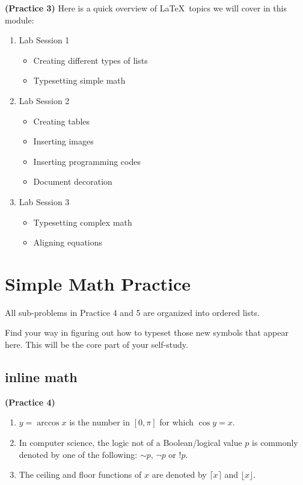 \documentclass[12pt]{article}
\begin{document}
\textbf{(Practice 3)} Here is a quick overview of \LaTeX\ topics we will cover in this module:

\begin{enumerate}
    \item Lab Session 1
    \begin{itemize}
        \item Creating different types of lists
        \item Typesetting simple math
    \end{itemize}

    \item Lab Session 2
    \begin{itemize}
        \item Creating tables
        \item Inserting images
        \item Inserting programming codes
        \item Document decoration
    \end{itemize}

    \item Lab Session 3
    \begin{itemize}
        \item Typesetting complex math
        \item Aligning equations
    \end{itemize}
\end{enumerate}

\newpage

\section{Simple Math Practice}

All sub-problems in Practice 4 and 5 are organized into ordered lists.

Find your way in figuring out how to typeset those new symbols that appear
here. This will be the core part of your self-study.

\subsection{inline math}

\textbf{(Practice 4)}

\begin{enumerate}
    \item $y = \arccos x$ is the number in $[0, \pi]$ for which $\cos y = x$.

    \item In computer science, the logic not of a Boolean/logical value $p$ is commonly
    denoted by one of the following: $\sim p$, $\neg p$ or $!p$.

    \item The ceiling and floor functions of $x$ are denoted by $\lceil x \rceil$ and $\lfloor x \rfloor$.
\end{enumerate}
\end{document}
